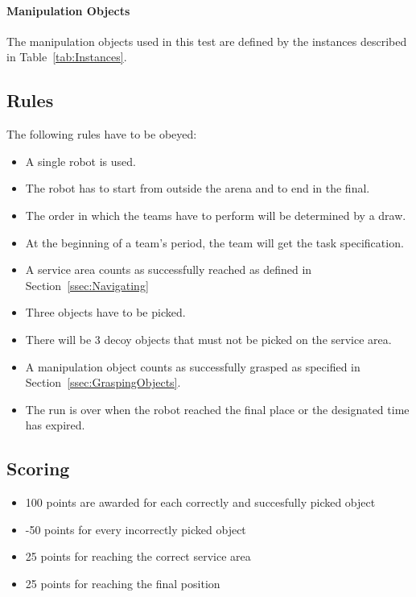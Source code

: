 \paragraph{Manipulation Objects}
The manipulation objects used in this test are defined by the instances described in Table~\ref{tab:Instances}.


\subsection{Rules}
The following rules have to be obeyed:

\begin{itemize}
\item A single robot is used. 
\item The robot has to start from outside the arena and to end in the final.
\item The order in which the teams have to perform will be determined by a draw.
\item At the beginning of a team's period, the team will get the task specification.
\item A service area counts as successfully reached as defined in Section~\ref{ssec:Navigating}
\item Three objects have to be picked.
\item There will be 3 decoy objects that must not be picked on the service area.
\item A manipulation object counts as successfully grasped as specified in Section~\ref{ssec:GraspingObjects}.
\item The run is over when the robot reached the final place or the designated time has expired.
\end{itemize}

\subsection{Scoring}
\begin{itemize}
\item 100 points are awarded for each correctly and succesfully picked object
\item -50 points for every incorrectly picked object
\item 25 points for reaching the correct service area
\item 25 points for reaching the final position
\end{itemize}
